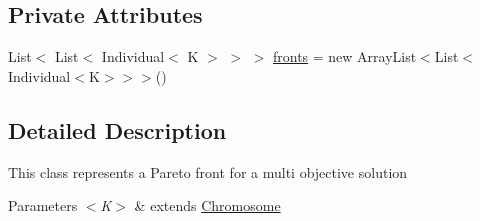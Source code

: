 \subsection*{Private Attributes}
\begin{DoxyCompactItemize}
\item 
List$<$ List$<$ Individual$<$ K $>$ $>$ $>$ \hyperlink{classjenes_1_1population_1_1_population_3_01_t_01extends_01_chromosome_01_4_1_1_pareto_3_01_k_01extends_01_chromosome_01_4_acf401dc9cc74ecbdf610d67bd9131aa2}{fronts} = new Array\-List$<$List$<$Individual$<$K$>$$>$$>$()
\end{DoxyCompactItemize}


\subsection{Detailed Description}
This class represents a Pareto front for a multi objective solution


\begin{DoxyParams}{Parameters}
{\em $<$\-K$>$} & extends \hyperlink{}{Chromosome} \\
\hline
\end{DoxyParams}


